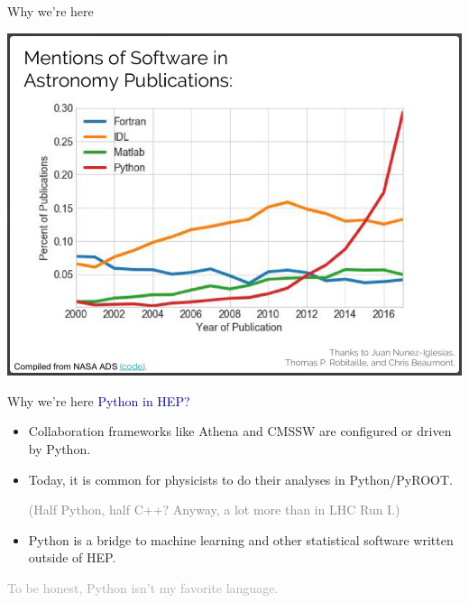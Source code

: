 \documentclass[aspectratio=169]{beamer}
\begin{document}
\begin{frame}{Why we're here}
\vspace{0.25 cm}
\begin{center}
\includegraphics[width=0.7\linewidth]{mentions-of-programming-languages.png}
\end{center}
\end{frame}

\begin{frame}{Why we're here}
\large
\vspace{0.5 cm}
\textcolor{darkblue}{\huge Python in HEP?}

\vspace{0.5 cm}
\begin{itemize}\setlength{\itemsep}{0.5 cm}
\item<2-> Collaboration frameworks like Athena and CMSSW are configured or driven by Python.

\item<3-> Today, it is common for physicists to do their analyses in Python/PyROOT.

\vspace{0.1 cm}
\textcolor{gray}{\normalsize (Half Python, half C++? Anyway, a lot more than in LHC Run I.)}

\item<4-> Python is a bridge to machine learning and other statistical software written outside of HEP.
\end{itemize}
\end{frame}

\begin{frame}{}
\Large
\vspace{1 cm}
\textcolor{darkgray}{To be honest, Python isn't my favorite language.}

\large
\vspace{1 cm}

\large
\vspace{1 cm}
\end{frame}
\end{document}
